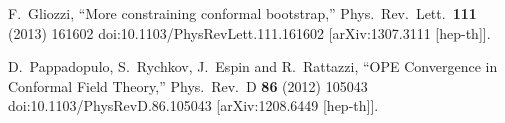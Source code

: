 \documentclass[letterpaper]{article}
\numberwithin{equation}{section}
\begin{document}
\begin{thebibliography}{10}
  F.~Gliozzi,
  ``More constraining conformal bootstrap,''
  Phys.\ Rev.\ Lett.\  {\bf 111} (2013) 161602
  doi:10.1103/PhysRevLett.111.161602
  [arXiv:1307.3111 [hep-th]].

  D.~Pappadopulo, S.~Rychkov, J.~Espin and R.~Rattazzi,
  ``OPE Convergence in Conformal Field Theory,''
  Phys.\ Rev.\ D {\bf 86} (2012) 105043
  doi:10.1103/PhysRevD.86.105043
  [arXiv:1208.6449 [hep-th]].


\end{thebibliography}

  
\end{document}
